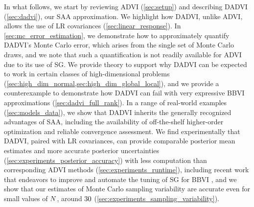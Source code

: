 In what follows, we start by reviewing ADVI (\cref{sec:setup}) and describing
DADVI (\cref{sec:dadvi}), our SAA approximation. We highlight how DADVI, unlike
ADVI, allows the use of LR covariances (\cref{sec:linear_response}). In
\cref{sec:mc_error_estimation}, we demonstrate how to approximately quantify
DADVI's Monte Carlo error, which arises from the single set of Monte Carlo
draws, and we note that such a quantification is not readily available for ADVI
due to its use of SG. We provide theory to support why DADVI can be expected to
work in certain classes of high-dimensional problems
(\cref{sec:high_dim_normal,sec:high_dim_global_local}), and we provide a
counterexample to demonstrate how DADVI can fail with very expressive BBVI
approximations (\cref{sec:dadvi_full_rank}). In a range of real-world examples
(\cref{sec:models_data}), we show that DADVI inherits the generally recognized
advantages of SAA, including the availability of off-the-shelf higher-order
optimization and reliable convergence assessment. We find experimentally that
DADVI, paired with LR covariances, can provide comparable posterior mean
estimates and more accurate posterior uncertainties
(\cref{sec:experiments_posterior_accuracy}) with less computation than
corresponding ADVI methods (\cref{sec:experiments_runtime}), including recent
work that endeavors to improve and automate the tuning of SG for BBVI
\citep{welandawe:2022:robustbbvi}, and we show that our estimates of Monte Carlo
sampling variability are accurate even for small values of $N$, around
$30$ (\cref{sec:experiments_sampling_variability}).